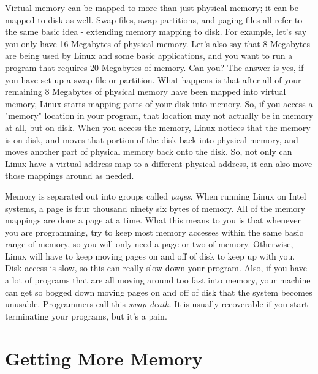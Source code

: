 Virtual memory can be mapped to more than just physical memory; it
can be mapped to disk as well.  Swap
files, swap partitions, and paging files all refer to the same 
basic idea - extending memory mapping to disk.  For example, let's
say you only have 16 Megabytes of physical memory.  Let's also say that
8 Megabytes are being used by Linux and some basic applications, and you
want to run a program that requires 20 Megabytes of memory.  Can you?  The
answer is yes, if you have set up a swap file or partition.  What
happens is that after all of your remaining 8 Megabytes of physical memory
have been mapped into virtual memory, Linux starts mapping parts of
your disk into memory.  So, if you access a "memory" location in your
program, that location may not actually be in memory at all, but on
disk.  When you access the memory, Linux notices that the memory
is on disk, and moves that portion of the disk back into physical 
memory, and moves another part of physical memory back onto the disk.
So, not only can Linux have a virtual address map to a different
physical address, it can also move those mappings around as needed.

Memory is separated out into groups called \emph{pages}.  When
running Linux on Intel systems, a page is four thousand ninety six bytes of memory.
All of the memory mappings are done a page at a time.  What this means to you
is that whenever you are programming, try to keep most memory accesses within
the same basic range of memory, so you will only need a page or two of memory.
Otherwise, Linux will have to keep moving pages on and off of disk to keep up
with you.  Disk access is slow, so this can really slow down your program.  Also,
if you have a lot of programs that are all moving around too fast into memory, your
machine can get so bogged down moving pages on and off of disk that the system
becomes unusable.  Programmers call this \emph{swap death}.  It is
usually recoverable if you start terminating your programs, but it's a pain.

\section{Getting More Memory}

